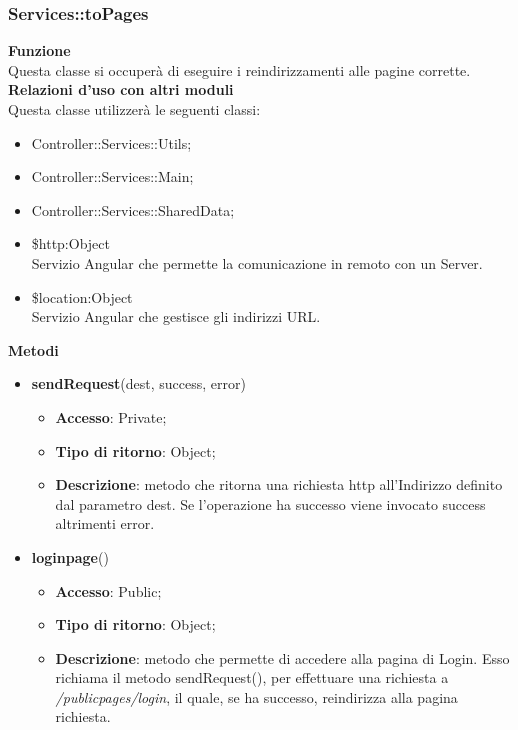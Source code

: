 {{		\subsubsection{Services::\-toPages}{
			\label{sub:servicestoPages}
			\textbf{Funzione}\\
			\indent Questa classe si occuperà di eseguire i reindirizzamenti alle pagine corrette.\\
			\textbf{Relazioni d'uso con altri moduli}\\
			\indent Questa classe utilizzerà le seguenti classi:
			\begin{itemize}
				\item Controller::Services::\-Utils;
				\item Controller::Services::\-Main;
				\item Controller::Services::\-SharedData;
				\item \$http:Object\\
					\indent Servizio Angular che permette la comunicazione in remoto con un Server.
				\item \$location:Object\\
					\indent Servizio Angular che gestisce gli indirizzi URL.
			\end{itemize}
			\textbf{Metodi}
			\begin{itemize}
				\item \textbf{sendRequest}(dest, success, error)
				\begin{itemize}
					\item \textbf{Accesso}: Private;
					\item \textbf{Tipo di ritorno}: Object;
					\item \textbf{Descrizione}: metodo che ritorna una richiesta http all'Indirizzo definito dal parametro dest. Se l'operazione ha successo viene invocato success altrimenti error.
				\end{itemize}
				\item \textbf{loginpage}()
				\begin{itemize}
					\item \textbf{Accesso}: Public;
					\item \textbf{Tipo di ritorno}: Object;
					\item \textbf{Descrizione}: metodo che permette di accedere alla pagina di Login. Esso richiama il metodo sendRequest(), per effettuare una richiesta a \textit{/publicpages/login}, il quale, se ha successo, reindirizza alla pagina richiesta.
				\end{itemize}

\end{itemize}}}}
